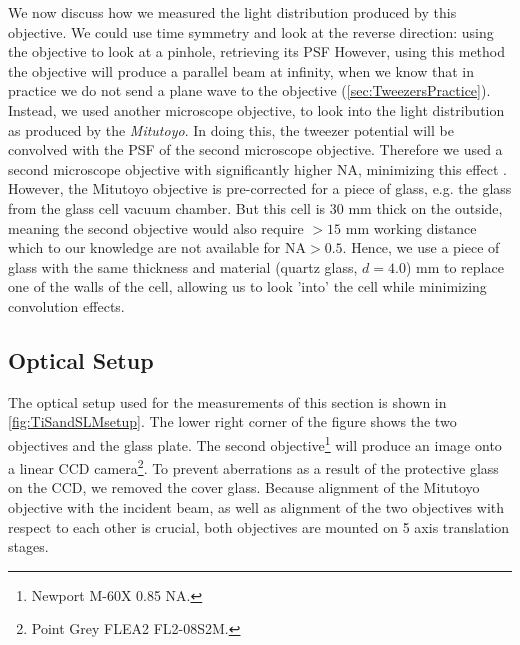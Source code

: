 We now discuss how we measured the light distribution produced by this objective.
We could use time symmetry and look at the reverse direction: using the objective to look at a pinhole, retrieving its \acf{PSF} \cite{Knottnerus2018,Sortais2007}
However, using this method the objective will produce a parallel beam at infinity, when we know that in practice we do not send a plane wave to the objective (\cref{sec:TweezersPractice}). 
Instead, we used another microscope objective, to look into the light distribution as produced by the \textit{Mitutoyo}. 
In doing this, the tweezer potential will be convolved with the \ac{PSF} of the second microscope objective.
Therefore we used a second microscope objective with significantly higher \ac{NA}, minimizing this effect \cite{Baumgaertner2017}. 
However, the Mitutoyo objective is pre-corrected for a piece of glass, e.g. the glass from the glass cell vacuum chamber. 
But this cell is 30 mm thick on the outside, meaning the second objective would also require $> 15$ mm working distance which to our knowledge are not available for $\text{NA}>0.5$.
Hence, we use a piece of glass with the same thickness and material (quartz glass, $d = 4.0$) mm to replace one of the walls of the cell, allowing us to look 'into' the cell while minimizing convolution effects.

\subsection{Optical Setup}

The optical setup used for the measurements of this section is shown in \cref{fig:TiSandSLMsetup}. The lower right corner of the figure shows the two objectives and the glass plate. 
The second objective\footnote{Newport M-60X 0.85 NA.} will produce an image onto a linear \ac{CCD} camera\footnote{Point Grey FLEA2 FL2-08S2M.}. 
To prevent aberrations as a result of the protective glass on the CCD, we removed the cover glass.
Because alignment of the Mitutoyo objective with the incident beam, as well as alignment of the two objectives with respect to each other is crucial, both objectives are mounted on 5 axis translation stages.

